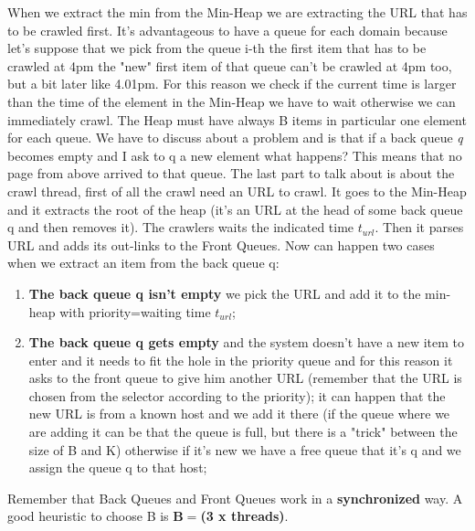 When we extract the min from the Min-Heap we are extracting the URL that has to be crawled first. It's advantageous to have a queue for each domain because let's suppose that we pick from the queue i-th the first item that has to be crawled at 4pm the "new" first item of that queue can't be crawled at 4pm too, but a bit later like 4.01pm.\newline
For this reason we check if the current time is larger than the time of the element in the Min-Heap we have to wait otherwise we can immediately crawl. The Heap must have always B items in particular one element for each queue.\newline
We have to discuss about a problem and is that if a back queue \textit{q} becomes empty and I ask to q a new element what happens? This means that no page from above arrived to that queue.\newline
The last part to talk about is about the crawl thread, first of all the crawl need an URL to crawl. It goes to the Min-Heap and it extracts the root of the heap (it's an URL at the head of some back queue q and then removes it). The crawlers waits the indicated time $t_{url}$. Then it parses URL and adds its out-links to the Front Queues.
Now can happen two cases when we extract an item from the back queue q:
\begin{enumerate}
    \item \textbf{The back queue q isn't empty} we pick the URL and add it to the min-heap with priority=waiting time $t_{url}$;
    \item \textbf{The back queue q gets empty} and the system doesn't have a new item to enter and it needs to fit the hole in the priority queue and for this reason it asks to the front queue to give him another URL (remember that the URL is chosen from the selector according to the priority); it can happen that the new URL is from a known host and we add it there (if the queue where we are adding it can be that the queue is full, but there is a "trick" between the size of B and K) otherwise if it's new we have a free queue that it's q and we assign the queue q to that host;
\end{enumerate}
Remember that Back Queues and Front Queues work in a \textbf{synchronized} way. A good heuristic to choose B is \textbf{B$=$(3 x threads)}.
